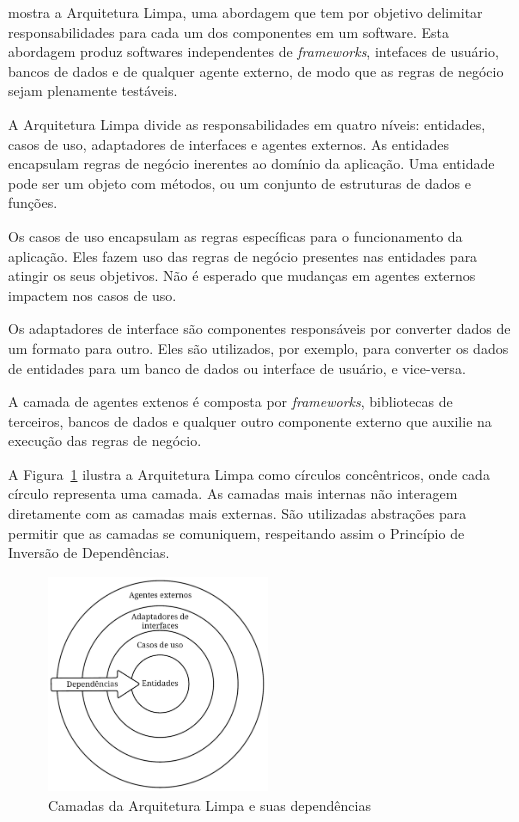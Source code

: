 \cite{clean-arch-book} mostra a Arquitetura Limpa, uma abordagem que tem por objetivo delimitar responsabilidades para cada um dos componentes em um software.
Esta abordagem produz softwares independentes de \emph{frameworks}, intefaces de usuário, bancos de dados e de qualquer agente externo, de modo que as regras de negócio sejam plenamente testáveis.

A Arquitetura Limpa divide as responsabilidades em quatro níveis: entidades, casos de uso, adaptadores de interfaces e agentes externos.
As entidades encapsulam regras de negócio inerentes ao domínio da aplicação.
Uma entidade pode ser um objeto com métodos, ou um conjunto de estruturas de dados e funções.

Os casos de uso encapsulam as regras específicas para o funcionamento da aplicação.
Eles fazem uso das regras de negócio presentes nas entidades para atingir os seus objetivos.
Não é esperado que mudanças em agentes externos impactem nos casos de uso.

Os adaptadores de interface são componentes responsáveis por converter dados de um formato para outro.
Eles são utilizados, por exemplo, para converter os dados de entidades para um banco de dados ou interface de usuário, e vice-versa.

A camada de agentes extenos é composta por \emph{frameworks}, bibliotecas de terceiros, bancos de dados e qualquer outro componente externo que auxilie na execução das regras de negócio.

A Figura~\ref{fig:clean_arch_circles} ilustra a Arquitetura Limpa como círculos concêntricos, onde cada círculo representa uma camada.
As camadas mais internas não interagem diretamente com as camadas mais externas.
São utilizadas abstrações para permitir que as camadas se comuniquem, respeitando assim o Princípio de Inversão de Dependências.

\begin{figure}[ht]
	\centering
	\includegraphics[width=0.52\textwidth]{images/clean_arch_circles.png}
	\caption{Camadas da Arquitetura Limpa e suas dependências}
	\label{fig:clean_arch_circles}
\end{figure}